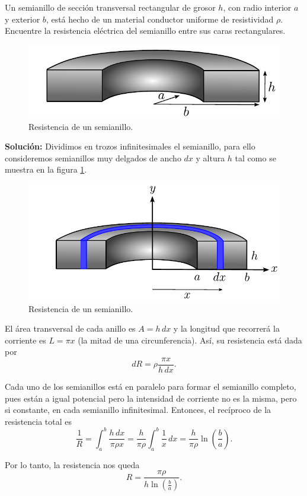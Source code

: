 \begin{ejemplo}
    Un semianillo de sección transversal rectangular de grosor $h$, con radio interior $a$ y exterior $b$, está hecho de un material conductor uniforme de resistividad $\rho$. Encuentre la resistencia eléctrica del semianillo entre sus caras rectangulares.

    \begin{figure}[H]
        \centering
        \includegraphics[scale = 0.75]{Figuras/Ej-2-Calculo-Resistencia.pdf}
        \caption{Resistencia de un semianillo.}
        \label{fig:Ej-2-Calculo-Resistencia}
    \end{figure}

    \textbf{Solución:} Dividimos en trozos infinitesimales el semianillo, para ello consideremos semianillos muy delgados de ancho $dx$ y altura $h$ tal como se muestra en la figura \ref{fig:Ej-2-Calculo-Resistencia}.

      \begin{figure}[H]
        \centering
        \includegraphics[scale = 0.75]{Figuras/Ej-2-Calculo-Resistencia-SistCoordenado.pdf}
        \caption{Resistencia de un semianillo.}
        \label{fig:Ej-2-Calculo-Resistencia-2}
    \end{figure}

    El área transversal de cada anillo es $A = h\,dx$ y la longitud que recorrerá la corriente es $L = \pi x$ (la mitad de una circunferencia). Así, su resistencia está dada por
    $$dR = \rho \frac{\pi x}{h\,dx}.$$

    Cada uno de los semianillos está en paralelo para formar el semianillo completo, pues están a igual potencial pero la intensidad de corriente no es la misma, pero si constante, en cada semianillo infinitesimal. Entonces, el recíproco de la resistencia total es
    $$\frac{1}{R} = \int_a^{b} \frac{h\,dx}{\pi \rho x} = \frac{h}{\pi \rho} \int_a^b \frac{1}{x}\,dx = \frac{h}{\pi\rho} \ln\left(\frac{b}{a}\right).$$

    Por lo tanto, la resistencia nos queda
    $$R = \frac{\pi \rho}{h \ln\left(\frac{b}{a} \right)}.$$
\end{ejemplo}

